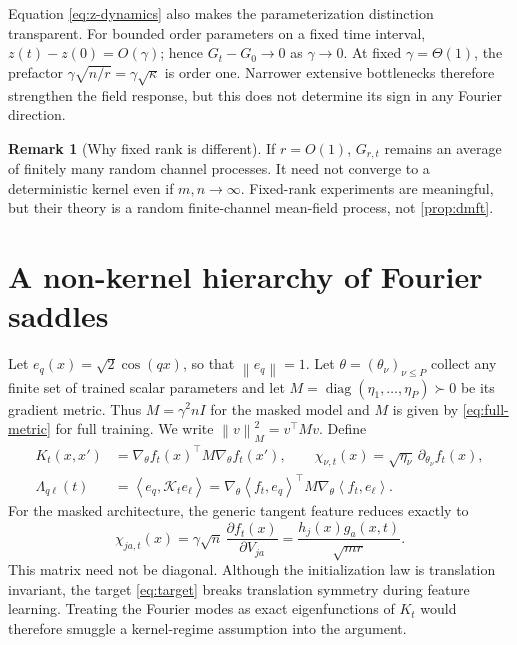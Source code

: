 \documentclass[11pt]{article}
\newcommand{\1}{\mathbf 1}
\newcommand{\ip}[2]{\left\langle #1,#2\right\rangle}
\newcommand{\norm}[1]{\left\lVert #1\right\rVert}
\newcommand{\diag}{\operatorname{diag}}
\theoremstyle{plain}
\theoremstyle{definition}
\newtheorem{remark}[theorem]{Remark}
\begin{document}
Equation \eqref{eq:z-dynamics} also makes the parameterization distinction
transparent.  For bounded order parameters on a fixed time interval,
\(z(t)-z(0)=O(\gamma)\); hence \(G_t-G_0\to0\) as \(\gamma\to0\).  At fixed
\(\gamma=\Theta(1)\), the prefactor
\(\gamma\sqrt{n/r}=\gamma\sqrt\kappa\) is order one.  Narrower extensive
bottlenecks therefore strengthen the field response, but this does not
determine its sign in any Fourier direction.

\begin{remark}[Why fixed rank is different]
If \(r=O(1)\), \(G_{r,t}\) remains an average of finitely many random channel
processes.  It need not converge to a deterministic kernel even if
\(m,n\to\infty\).  Fixed-rank experiments are meaningful, but their theory
is a random finite-channel mean-field process, not 
\cref{prop:dmft}.
\end{remark}

\section{A non-kernel hierarchy of Fourier saddles}
\label{sec:theory}

Let \(e_q(x)=\sqrt2\cos(qx)\), so that \(\norm{e_q}=1\).  Let
\(\theta=(\theta_\nu)_{\nu\leq P}\) collect any finite set of trained scalar
parameters and let \(M=\diag(\eta_1,\ldots,\eta_P)\succ0\) be its gradient
metric.  Thus \(M=\gamma^2nI\) for the masked model and \(M\) is given by
\cref{eq:full-metric} for full training.  We write
\(\norm{v}_M^2=v^\top Mv\).  Define
\begin{align}
 K_t(x,x')&=\nabla_\theta f_t(x)^\top M\nabla_\theta f_t(x'),
 \qquad
 \chi_{\nu,t}(x)=\sqrt{\eta_\nu}\,\partial_{\theta_\nu}f_t(x),
 \label{eq:generic-tangent}\\
 \Lambda_{q\ell}(t)
 &=\ip{e_q}{\mathcal K_te_\ell}
 =\nabla_\theta\ip{f_t}{e_q}^\top
 M\nabla_\theta\ip{f_t}{e_\ell}.
 \label{eq:fourier-matrix}
\end{align}
For the masked architecture, the generic tangent feature reduces exactly to
\begin{equation}
 \chi_{ja,t}(x)=\gamma\sqrt n\,
 \frac{\partial f_t(x)}{\partial V_{ja}}
 =\frac{h_j(x)g_a(x,t)}{\sqrt{mr}}.
 \label{eq:tangent-feature}
\end{equation}
This matrix need not be diagonal.  Although the initialization law is
translation invariant, the target \eqref{eq:target} breaks translation
symmetry during feature learning.  Treating the Fourier modes as exact
eigenfunctions of \(K_t\) would therefore smuggle a kernel-regime assumption
into the argument.
\end{document}
